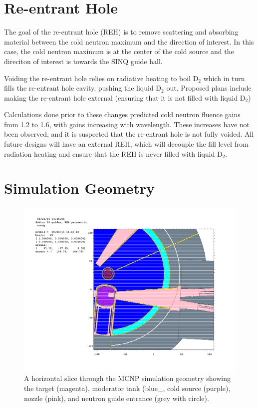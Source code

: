 \documentclass[a4paper]{jpconf}
\begin{document}
\section{Re-entrant Hole}

The goal of the re-entrant hole (REH) is to remove scattering and absorbing material between the cold neutron maximum and the direction of interest.  In this case, the cold neutron maximum is at the center of the cold source and the direciton of interest is towards the SINQ guide hall.  

Voiding the re-entrant hole relies on radiative heating to boil D$_2$ which in turn fills the re-entrant hole cavity, pushing the liquid D$_2$ out.  Proposed plans include making the re-entrant hole external (ensuring that it is not filled with liquid D$_2$)

Calculations done prior to these changes predicted cold neutron fluence gains from 1.2 to 1.6, with gains increasing with wavelength. These increases have not been observed, and it is suspected that the re-entrant hole is not fully voided.  All future designs will have an external REH, which will decouple the fill level from radiation heating and ensure that the REH is never filled with liquid D$_2$.

\section{Simulation Geometry}

\begin{figure}
\begin{center}
\includegraphics[trim={9.2cm 8cm 4cm 8cm},clip]{graphics/geom.pdf}
\end{center}
\caption{\label{geom}A horizontal slice through the MCNP simulation geometry showing the target (magenta), moderator tank (blue_, cold source (purple), nozzle (pink), and neutron guide entrance (grey with circle).}
\end{figure}
\end{document}
